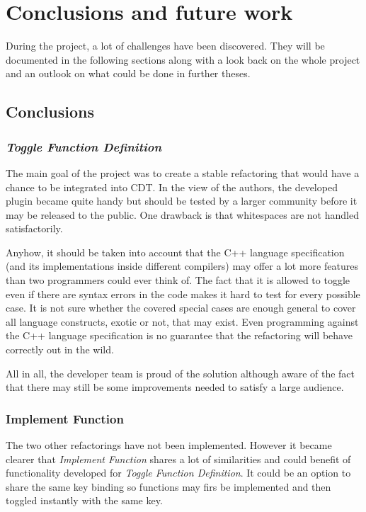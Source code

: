 \chapter{Conclusions and future work}
\thispagestyle{fancy}

During the project, a lot of challenges have been discovered. They will be 
documented in the following sections along with a look back on the whole project 
and an outlook on what could be done in further theses. 

\section{Conclusions}

\subsection{\textit{Toggle Function Definition}}
The main goal of the project was to create a stable refactoring that would have 
a chance to be integrated into CDT. In the view of the authors, the developed 
plugin became quite handy but should be tested by a larger community before it 
may be released to the public. One drawback is that whitespaces are not handled 
satisfactorily.

Anyhow, it should be taken into account that the C++ language specification (and 
its implementations inside different compilers) may offer a lot more features 
than two programmers could ever think of. The fact that it is allowed to toggle 
even if there are syntax errors in the code makes it hard to test for every 
possible case. It is not sure whether the covered special cases are enough 
general to cover all language constructs, exotic or not, that may exist. Even 
programming against the C++ language specification is no guarantee that the 
refactoring will behave correctly out in the wild.

All in all, the developer team is proud of the solution although aware of the 
fact that there may still be some improvements needed to satisfy a large 
audience.

\subsection{Implement Function}
The two other refactorings have not been implemented. However it became clearer 
that \textit{Implement Function} shares a lot of similarities and could benefit 
of functionality developed for \textit{Toggle Function Definition}. It could be 
an option to share the same key binding so functions may firs be implemented and 
then toggled instantly with the same key.

